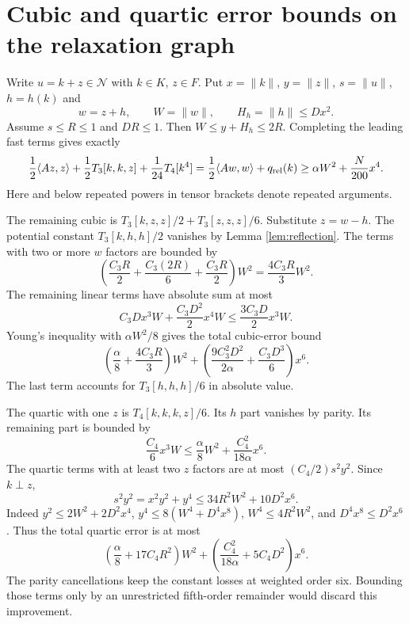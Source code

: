 \documentclass[11pt,a4paper]{article}
\begin{document}
\section{Cubic and quartic error bounds on the relaxation graph}
Write $u=k+z\in\mathcal N$ with $k\in K$, $z\in F$. Put $x=\|k\|$, $y=\|z\|$, $s=\|u\|$, $h=h(k)$ and
\[
w=z+h,\qquad W=\|w\|,\qquad H_h=\|h\|\le Dx^2.
\]
Assume $s\le R\le1$ and $DR\le1$. Then $W\le y+H_h\le2R$. Completing the leading fast terms gives exactly
\[
\frac12\langle Az,z\rangle+\frac12T_3[k,k,z]+\frac1{24}T_4[k^4]
=\frac12\langle Aw,w\rangle+q_{\rm rel}(k)
\ge\alpha W^2+\frac N{200}x^4.
\]
Here and below repeated powers in tensor brackets denote repeated arguments.

The remaining cubic is $T_3[k,z,z]/2+T_3[z,z,z]/6$. Substitute $z=w-h$. The potential constant $T_3[k,h,h]/2$ vanishes by Lemma \ref{lem:reflection}. The terms with two or more $w$ factors are bounded by
\[
\left(\frac{C_3R}{2}+\frac{C_3(2R)}6+\frac{C_3R}{2}\right)W^2
=\frac{4C_3R}{3}W^2.
\]
The remaining linear terms have absolute sum at most
\[
C_3Dx^3W+\frac{C_3D^2}{2}x^4W\le\frac{3C_3D}{2}x^3W.
\]
Young's inequality with $\alpha W^2/8$ gives the total cubic-error bound
\begin{equation}\label{eq:cubic}
\left(\frac\alpha8+\frac{4C_3R}{3}\right)W^2
+\left(\frac{9C_3^2D^2}{2\alpha}+\frac{C_3D^3}{6}\right)x^6.
\end{equation}
The last term accounts for $T_3[h,h,h]/6$ in absolute value.

The quartic with one $z$ is $T_4[k,k,k,z]/6$. Its $h$ part vanishes by parity. Its remaining part is bounded by
\[
\frac{C_4}{6}x^3W\le\frac\alpha8W^2+\frac{C_4^2}{18\alpha}x^6.
\]
The quartic terms with at least two $z$ factors are at most $(C_4/2)s^2y^2$. Since $k\perp z$,
\[
s^2y^2=x^2y^2+y^4\le34R^2W^2+10D^2x^6.
\]
Indeed $y^2\le2W^2+2D^2x^4$, $y^4\le8(W^4+D^4x^8)$, $W^4\le4R^2W^2$, and $D^4x^8\le D^2x^6$. Thus the total quartic error is at most
\begin{equation}\label{eq:quartic}
\left(\frac\alpha8+17C_4R^2\right)W^2
+\left(\frac{C_4^2}{18\alpha}+5C_4D^2\right)x^6.
\end{equation}
The parity cancellations keep the constant losses at weighted order six. Bounding those terms only by an unrestricted fifth-order remainder would discard this improvement.
\newpage
\end{document}
